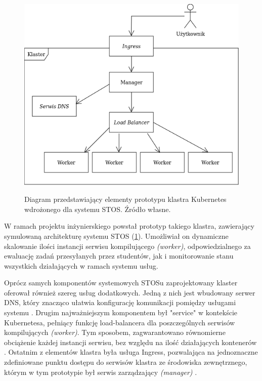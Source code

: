 \begin{figure}[!h]
	\begin{center}
		\resizebox{0.7\textwidth}{!} {
			\includegraphics{img/4/k8s.png}
		}
		\caption[Diagram prototypu klastra Kubernetes]{Diagram przedstawiający elementy prototypu klastra Kubernetes wdrożonego dla systemu STOS. Źródło własne.}
		\label{diagramk8s}
	\end{center}
\end{figure}

W ramach projektu inżynierskiego powstał prototyp takiego klastra, zawierający symulowaną architekturę systemu STOS (\ref{diagramk8s}). Umożliwiał on dynamiczne skalowanie ilości instancji serwisu kompilującego \textit{(worker)}, odpowiedzialnego za ewaluację zadań przesyłanych przez studentów, jak i monitorowanie stanu wszystkich działających w ramach systemu usług.

Oprócz samych komponentów systemowych STOSu zaprojektowany klaster oferował również szereg usług dodatkowych. Jedną z nich jest wbudowany serwer DNS, który znacząco ułatwia konfigurację komunikacji pomiędzy usługami systemu \cite{k8sDns}. Drugim najważniejszym komponentem był "service" w kontekście Kubernetesa, pełniący funkcję load-balancera dla poszczególnych serwisów kompilujących \textit{(worker)}. Tym sposobem, zagwarantowano równomierne obciążenie każdej instancji serwisu, bez względu na ilość działających kontenerów \cite{k8sService}. Ostatnim z elementów klastra była usługa Ingress, pozwalająca na jednoznaczne zdefiniowane punktu dostępu do serwisów klastra ze środowiska zewnętrznego, którym w tym prototypie był serwis zarządzający \textit{(manager)} \cite{k8sIngress}.

